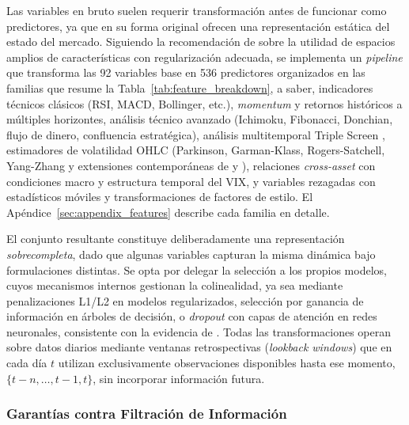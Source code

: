 ﻿\documentclass[11pt,a4paper]{article}
\begin{document}
Las variables en bruto suelen requerir transformaci\'on antes de funcionar como predictores, ya que en su forma original ofrecen una representaci\'on est\'atica del estado del mercado. Siguiendo la recomendaci\'on de \citet{gu2020} sobre la utilidad de espacios amplios de caracter\'isticas con regularizaci\'on adecuada, se implementa un \textit{pipeline} que transforma las 92 variables base en 536 predictores organizados en las familias que resume la Tabla~\ref{tab:feature_breakdown}, a saber, indicadores t\'ecnicos cl\'asicos (RSI, MACD, Bollinger, etc.), \textit{momentum} y retornos hist\'oricos a m\'ultiples horizontes, an\'alisis t\'ecnico avanzado (Ichimoku, Fibonacci, Donchian, flujo de dinero, confluencia estrat\'egica), an\'alisis multitemporal Triple Screen \citep{elder1993}, estimadores de volatilidad OHLC (Parkinson, Garman-Klass, Rogers-Satchell, Yang-Zhang y extensiones contempor\'aneas de \citet{alizadeh2002} y \citet{chou2005}), relaciones \textit{cross-asset} con condiciones macro y estructura temporal del VIX, y variables rezagadas con estad\'isticos m\'oviles y transformaciones de factores de estilo. El Ap\'endice~\ref{sec:appendix_features} describe cada familia en detalle.

El conjunto resultante constituye deliberadamente una representaci\'on \textit{sobrecompleta}, dado que algunas variables capturan la misma din\'amica bajo formulaciones distintas. Se opta por delegar la selecci\'on a los propios modelos, cuyos mecanismos internos gestionan la colinealidad, ya sea mediante penalizaciones L1/L2 en modelos regularizados, selecci\'on por ganancia de informaci\'on en \'arboles de decisi\'on, o \textit{dropout} con capas de atenci\'on en redes neuronales, consistente con la evidencia de \citet{gu2020}. Todas las transformaciones operan sobre datos diarios mediante ventanas retrospectivas (\textit{lookback windows}) que en cada d\'ia $t$ utilizan exclusivamente observaciones disponibles hasta ese momento, $\{t-n, \ldots, t-1, t\}$, sin incorporar informaci\'on futura.

\subsubsection{Garant\'ias contra Filtraci\'on de Informaci\'on}
\end{document}

